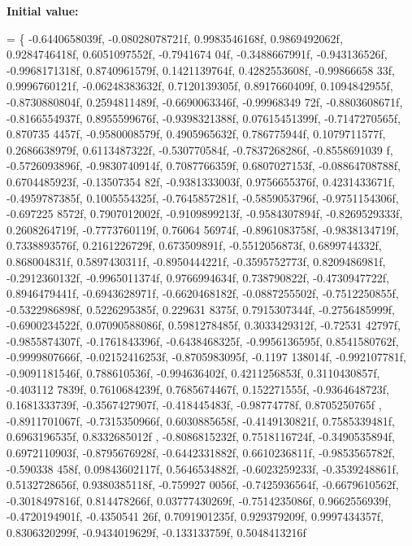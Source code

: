 {\bfseries Initial value\+:}
\begin{DoxyCode}
=
\{
    -0.6440658039f, -0.08028078721f, 0.9983546168f, 0.9869492062f, 0.9284746418f, 0.6051097552f, -0.7941674
      04f, -0.3488667991f, -0.943136526f, -0.9968171318f, 0.8740961579f, 0.1421139764f, 0.4282553608f, -0.99866658
      33f, 0.9996760121f, -0.06248383632f,
    0.7120139305f, 0.8917660409f, 0.1094842955f, -0.8730880804f, 0.2594811489f, -0.6690063346f, -0.99968349
      72f, -0.8803608671f, -0.8166554937f, 0.8955599676f, -0.9398321388f, 0.07615451399f, -0.7147270565f, 0.870735
      4457f, -0.9580008579f, 0.4905965632f,
    0.786775944f, 0.1079711577f, 0.2686638979f, 0.6113487322f, -0.530770584f, -0.7837268286f, -0.8558691039
      f, -0.5726093896f, -0.9830740914f, 0.7087766359f, 0.6807027153f, -0.08864708788f, 0.6704485923f, -0.13507354
      82f, -0.9381333003f, 0.9756655376f,
    0.4231433671f, -0.4959787385f, 0.1005554325f, -0.7645857281f, -0.5859053796f, -0.9751154306f, -0.697225
      8572f, 0.7907012002f, -0.9109899213f, -0.9584307894f, -0.8269529333f, 0.2608264719f, -0.7773760119f, 0.76064
      56974f, -0.8961083758f, -0.9838134719f,
    0.7338893576f, 0.2161226729f, 0.673509891f, -0.5512056873f, 0.6899744332f, 0.868004831f, 0.5897430311f,
       -0.8950444221f, -0.3595752773f, 0.8209486981f, -0.2912360132f, -0.9965011374f, 0.9766994634f, 0.738790822f,
       -0.4730947722f, 0.8946479441f,
    -0.6943628971f, -0.6620468182f, -0.0887255502f, -0.7512250855f, -0.5322986898f, 0.5226295385f, 0.229631
      8375f, 0.7915307344f, -0.2756485999f, -0.6900234522f, 0.07090588086f, 0.5981278485f, 0.3033429312f, -0.72531
      42797f, -0.9855874307f, -0.1761843396f,
    -0.6438468325f, -0.9956136595f, 0.8541580762f, -0.9999807666f, -0.02152416253f, -0.8705983095f, -0.1197
      138014f, -0.992107781f, -0.9091181546f, 0.788610536f, -0.994636402f, 0.4211256853f, 0.3110430857f, -0.403112
      7839f, 0.7610684239f, 0.7685674467f,
    0.152271555f, -0.9364648723f, 0.1681333739f, -0.3567427907f, -0.418445483f, -0.98774778f, 0.8705250765f
      , -0.8911701067f, -0.7315350966f, 0.6030885658f, -0.4149130821f, 0.7585339481f, 0.6963196535f, 0.8332685012f
      , -0.8086815232f, 0.7518116724f,
    -0.3490535894f, 0.6972110903f, -0.8795676928f, -0.6442331882f, 0.6610236811f, -0.9853565782f, -0.590338
      458f, 0.09843602117f, 0.5646534882f, -0.6023259233f, -0.3539248861f, 0.5132728656f, 0.9380385118f, -0.759927
      0056f, -0.7425936564f, -0.6679610562f,
    -0.3018497816f, 0.814478266f, 0.03777430269f, -0.7514235086f, 0.9662556939f, -0.4720194901f, -0.4350541
      26f, 0.7091901235f, 0.929379209f, 0.9997434357f, 0.8306320299f, -0.9434019629f, -0.133133759f, 0.5048413216f

\end{DoxyCode}
